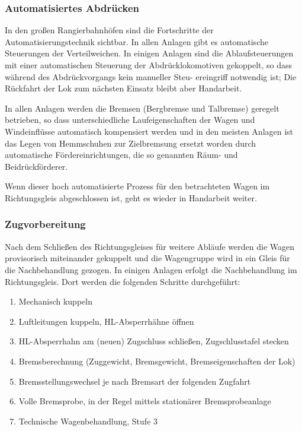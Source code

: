 \subsubsection{Automatisiertes Abdrücken}\label{sec:automAbdruecken}
In den großen Rangierbahnhöfen sind die Fortschritte der Automatisierungstechnik sichtbar. In allen Anlagen gibt es automatische Steuerungen der Verteilweichen. In einigen Anlagen sind die Ablaufsteuerungen mit einer automatischen Steuerung der Abdrücklokomotiven gekoppelt, so dass während des Abdrückvorgangs kein manueller Steu- ereingriff notwendig ist; Die Rückfahrt der Lok zum nächsten Einsatz bleibt aber Handarbeit.\par 
In allen Anlagen werden die Bremsen (\gls{Bergbremse} und \gls{Talbremse}) geregelt betrieben, so dass unterschiedliche Laufeigenschaften der Wagen und Windeinflüsse automatisch kompensiert werden und in den meisten Anlagen ist das Legen von Hemmschuhen zur Zielbremsung ersetzt worden durch automatische Fördereinrichtungen, die so genannten Räum- und Beidrückförderer.\par
Wenn dieser hoch automatisierte Prozess für den betrachteten Wagen im Richtungsgleis abgeschlossen ist, geht es wieder in Handarbeit weiter.
\subsubsection{Zugvorbereitung}\label{sec:Zugvorbereitung}
Nach dem Schließen des Richtungsgleises für weitere Abläufe werden die Wagen provisorisch miteinander gekuppelt und die Wagengruppe wird in ein Gleis für die Nachbehandlung gezogen. In einigen Anlagen erfolgt die Nachbehandlung im Richtungsgleis. Dort werden die folgenden Schritte durchgeführt:
\begin{enumerate}
    \item Mechanisch kuppeln
    \item Luftleitungen kuppeln, \acrshort{HL}-Absperrhähne öffnen
    \item \acrshort{HL}-Absperrhahn am (neuen) \gls{Zugschluss} schließen, Zugschlusstafel stecken
    \item Bremsberechnung (Zuggewicht, Bremsgewicht, Bremseigenschaften der Lok)
    \item Bremsstellungswechsel je nach Bremsart der folgenden \gls{Zugfahrt}
    \item Volle \gls{Bremsprobe}, in der Regel mittels stationärer \gls{Bremsprobeanlage}
    \item Technische Wagenbehandlung, Stufe 3
\end{enumerate}
